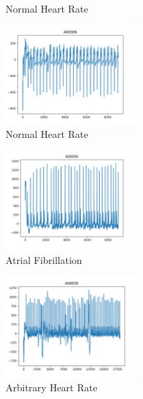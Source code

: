 \documentclass[review]{elsarticle}
\begin{document}
\begin{figure}[h!]\label{Normal_Heart_Rate}
	\caption{Normal Heart Rate}
\end{figure}

\begin{figure}[h!]
	\includegraphics[width=50mm,scale=0.5]{./Figures/NormalHeartRate.png}
	\centering
	\caption{Normal Heart Rate}
	\label{fig:NormalHeartRate}
\end{figure}


\begin{figure}[h!]
	\includegraphics[width=50mm,scale=0.5]{./Figures/AtrialFibrillation.png}
	\centering
	\caption{Atrial Fibrillation}
	\label{fig:AtrialFibrillation}
\end{figure}

\begin{figure}[h!]
	\includegraphics[width=50mm,scale=0.5]{./Figures/ArbitraryHeartRate.png}
	\centering
	\caption{Arbitrary Heart Rate}
	\label{fig:ArbitraryHeartRate}
\end{figure}
\end{document}
